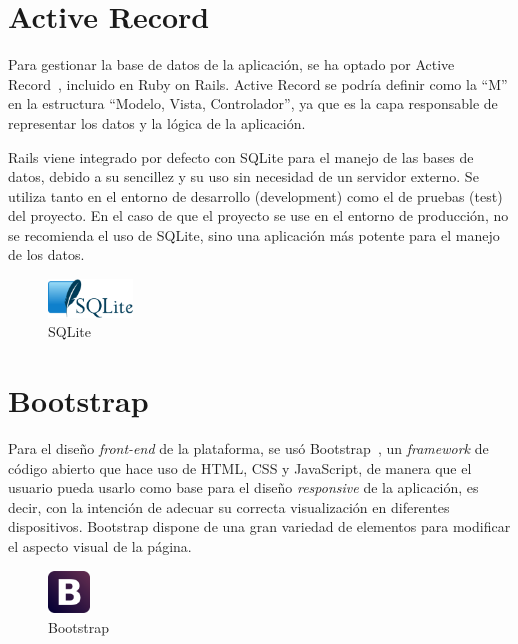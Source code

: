 \section{Active Record}
\label{3:sec:2}

Para gestionar la base de datos de la aplicación, se ha optado por Active Record~\cite{Active}, incluido en Ruby on Rails. Active Record se podría definir como la ``M'' en la estructura ``Modelo, Vista, Controlador'', ya que es la capa responsable de representar los datos y la lógica de la aplicación.

Rails viene integrado por defecto con SQLite para el manejo de las bases de datos, debido a su sencillez y su uso sin necesidad de un servidor externo. Se utiliza tanto en el entorno de desarrollo (development) como el de pruebas (test) del proyecto. 
En el caso de que el proyecto se use en el entorno de producción, no se recomienda el uso de SQLite, sino una aplicación más potente para el manejo de los datos.

\begin{figure}[!th]
\begin{center}
\includegraphics[width=0.2\textwidth]{images/logo_sqlite.eps}
\caption{SQLite}
\label{fig:5}
\end{center}
\end{figure}


\section{Bootstrap}
\label{3:sec:3}

Para el diseño \textit{front-end} de la plataforma, se usó Bootstrap~\cite{Bootstrap}, un \textit{framework} de código abierto que hace uso de HTML, CSS y JavaScript, de manera que el usuario pueda usarlo como base para el diseño \textit{responsive} de la aplicación, es decir, con la intención de adecuar su correcta visualización en diferentes dispositivos. Bootstrap dispone de una gran variedad de elementos para modificar el aspecto visual
de la página.

\begin{figure}[!th]
\begin{center}
\includegraphics[width=0.1\textwidth]{images/logo_bootstrap.eps}
\caption{Bootstrap}
\label{fig:6}
\end{center}
\end{figure}

